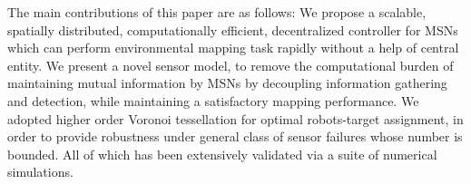 \documentclass[letterpaper, 10 pt, conference]{ieeeconf}
\begin{document}
%








The main contributions of this paper are as follows:
We propose a scalable, spatially distributed, computationally efficient, decentralized controller for MSNs which can perform environmental mapping task rapidly without a help of central entity. 
We present a novel sensor model, to remove the computational burden of maintaining mutual information by MSNs by decoupling information gathering and detection, while maintaining a satisfactory mapping performance.
We adopted higher order Voronoi tessellation for optimal robots-target assignment, in order to provide robustness under general class of sensor failures whose number is bounded.
All of which has been extensively validated via a suite of numerical simulations. 
\end{document}
